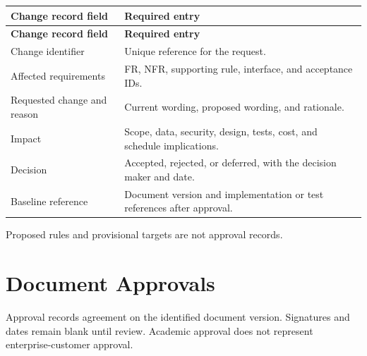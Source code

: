 \documentclass[11pt,letterpaper]{article}
\begin{document}
\begin{longtable}{|P{\arrayrulewidth\relax}|P{\arrayrulewidth\relax}|}

\hline{}

\textbf{Change record field} & \textbf{Required entry} \\ \hline

\endfirsthead

\hline{}

\textbf{Change record field} & \textbf{Required entry} \\ \hline

\endhead

\hline\endfoot

\hline\endlastfoot

Change identifier & Unique reference for the request. \\ \hline

Affected requirements & FR, NFR, supporting rule, interface, and acceptance IDs. \\ \hline

Requested change and reason & Current wording, proposed wording, and rationale. \\ \hline

Impact & Scope, data, security, design, tests, cost, and schedule implications. \\ \hline

Decision & Accepted, rejected, or deferred, with the decision maker and date. \\ \hline

Baseline reference & Document version and implementation or test references after approval. \\ \hline

\end{longtable}

\endgroup

Proposed rules and provisional targets are not approval records.\par

\clearpage

\section{Document Approvals}

Approval records agreement on the identified document version. Signatures and dates remain blank until review. Academic approval does not represent enterprise-customer approval.\par
\end{document}
